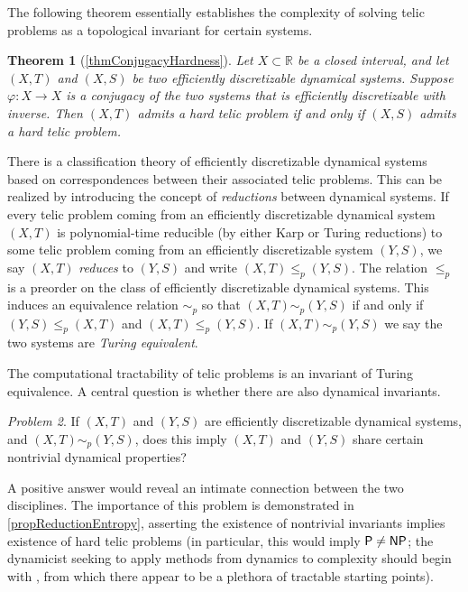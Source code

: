 \documentclass{amsart}
\theoremstyle{theorem}
\newtheorem{theorem}{Theorem}[section]
\theoremstyle{remark}
\newtheorem{problem}[theorem]{Problem}
\numberwithin{equation}{section}
\newcommand{\RR}{\mathbb{R}}
\newcommand{\ccP}{\textsf{\upshape P}}
\newcommand{\ccNP}{\textsf{\upshape NP}}
\begin{document}
The following theorem essentially establishes the complexity of solving telic problems as a topological invariant for certain systems.

\begin{theorem}[\cref{thmConjugacyHardness}]\label{thmConjugacyHardness1}
Let $X \subset \RR$ be a closed interval, and let $(X, T)$ and $(X, S)$ be two efficiently discretizable dynamical systems.
Suppose $\varphi:X\rightarrow X$ is a conjugacy of the two systems that is efficiently discretizable with inverse.
Then $(X, T)$ admits a hard telic problem if and only if $(X, S)$ admits a hard telic problem.
\end{theorem}

There is a classification theory of efficiently discretizable dynamical systems based on correspondences between their associated telic problems.
This can be realized by introducing the concept of \emph{reductions} between dynamical systems. If every telic problem coming from an efficiently discretizable dynamical system $(X, T)$ is polynomial-time reducible (by either Karp or Turing reductions) to some telic problem coming from an efficiently discretizable system $(Y, S)$, we say $(X, T)$ \emph{reduces} to $(Y, S)$ and write $(X, T) \leq_p (Y, S)$.
The relation $\leq_p$ is a preorder on the class of efficiently discretizable dynamical systems. This induces an equivalence relation $\sim_p$ so that $(X, T) \sim_p (Y, S)$ if and only if $(Y, S) \leq_p (X, T)$ and $(X, T) \leq_p (Y, S)$. If $(X, T) \sim_p (Y, S)$ we say the two systems are \emph{Turing equivalent}.

The computational tractability of telic problems is an invariant of Turing equivalence. A central question is whether there are also dynamical invariants.

\begin{problem}\label{probMain}
If $(X, T)$ and $(Y, S)$ are efficiently discretizable dynamical systems, and $(X, T) \sim_p (Y, S)$, does this imply $(X, T)$ and $(Y, S)$ share certain nontrivial dynamical properties?
\end{problem}

A positive answer would reveal an intimate connection between the two disciplines. The importance of this problem is demonstrated in \cref{propReductionEntropy}, asserting the existence of nontrivial invariants implies existence of hard telic problems (in particular, this would imply $\ccP \neq \ccNP$; the dynamicist seeking to apply methods from dynamics to complexity should begin with \cite{everett2}, from which there appear to be a plethora of tractable starting points).
\end{document}
